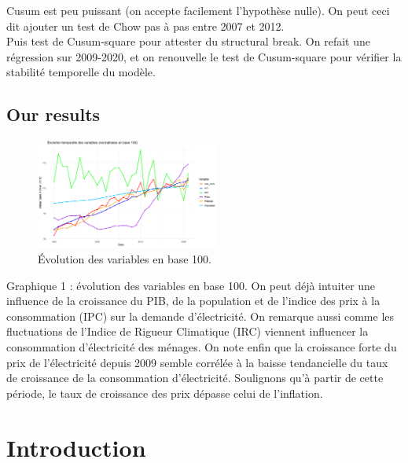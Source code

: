 Cusum est peu puissant (on accepte facilement l’hypothèse nulle). On peut ceci dit ajouter un test de Chow pas à pas entre 2007 et 2012. \\

Puis test de Cusum-square pour attester du structural break. On refait une régression sur 2009-2020, et on renouvelle le test de Cusum-square pour vérifier la stabilité temporelle du modèle. 

\subsection{Our results}
\begin{figure}[h]
    \centering
      \includegraphics[width=0.54\textwidth]{Images/data_base100_2015.jpeg}
      \caption{Évolution des variables en base 100.}
          \label{var}
  \end{figure}

Graphique 1 : évolution des variables en base 100. On peut déjà intuiter une influence de la croissance du PIB, de la population et de l'indice des prix à la consommation (IPC) sur la demande d'électricité. On remarque aussi comme les fluctuations de l'Indice de Rigueur Climatique (IRC) viennent influencer la consommation d'électricité des ménages. On note enfin que la croissance forte du prix de l'électricité depuis 2009 semble corrélée à la baisse tendancielle du taux de croissance de la consommation d'électricité. Soulignons qu'à partir de cette période, le taux de croissance des prix dépasse celui de l'inflation.

\section{Introduction}

